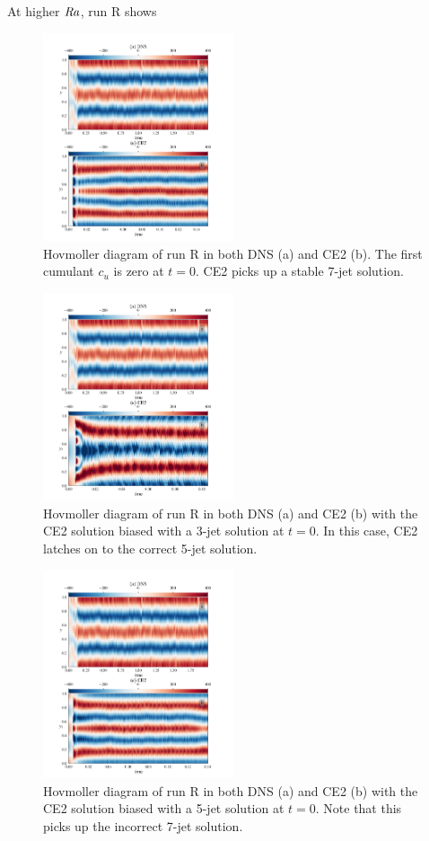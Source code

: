 \documentclass{jfm}
\newcommand{\Rayleigh}{\mbox{\textit{Ra}}}  %
\begin{document}
At higher $\Rayleigh$, run R shows 
\begin{figure}
  \centering
  \includegraphics[width=0.5\textwidth]{../../figs/hov_cu_dns_ce2_run_R.pdf}
  \caption{Hovmoller diagram of run R in both DNS (a) and CE2 (b). The first cumulant $c_u$ is zero at $t = 0$. CE2 picks up a stable 7-jet solution.}
  \label{fig:hov_run_R}
\end{figure}
\begin{figure}
  \centering
  \includegraphics[width=0.5\textwidth]{../../figs/hov_cu_dns_ce2_run_S.pdf}
  \caption{Hovmoller diagram of run R in both DNS (a) and CE2 (b) with the CE2 solution biased with a 3-jet solution at $t=0$. In this case, CE2 latches on to the correct 5-jet solution.}
   \label{fig:hov_run_R}
\end{figure}
\begin{figure}
  \centering
  \includegraphics[width=0.5\textwidth]{../../figs/hov_cu_dns_ce2_run_T.pdf}
  \caption{Hovmoller diagram of run R in both DNS (a) and CE2 (b) with the CE2 solution biased with a 5-jet solution at $t=0$. Note that this picks up the incorrect 7-jet solution.}
  \label{fig:hov_run_S}
\end{figure}
\end{document}
